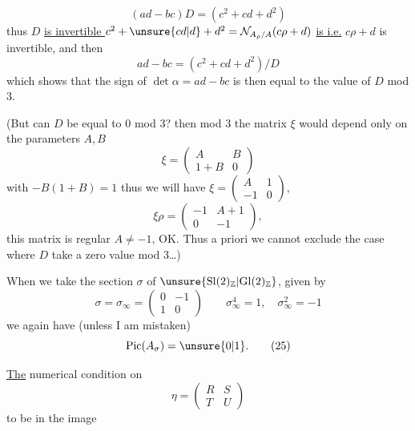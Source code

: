 
\[
(ad-bc)D=(c^2+cd+d^2) \tag{23}
\]
thus $D$ \uline{is invertible } $c^2+\unsure{cd|d}+d^2=\mathcal{N}_{A_\rho/A}(c\rho+d)$ \uline{is i.e.}  $c\rho+d$ is invertible, and then
\[
ad-bc=(c^2+cd+d^2)/D
\]
which shows that the sign of $\det\alpha=ad-bc$ is then equal to the value of $D$ mod $3$.

(But can $D$ be equal to $0$ mod $3$? then mod $3$ the matrix $\xi$  would depend only on the parameters $A,B$
\[
\xi=\begin{pmatrix}A&B\\1+B&0\end{pmatrix}
\]
with $-B(1+B)=1$   
thus we will have $\xi=\begin{pmatrix}A&1\\-1&0\end{pmatrix}$, 
\[
\xi\rho=\begin{pmatrix}-1&A+1\\0&-1\end{pmatrix},
\]
this matrix is regular  $A\ne-1$, OK.\unsure{)|\}} Thus a priori we cannot exclude the case where $D$  take a zero value mod $3$\ldots)

When we take the section $\sigma$ of $\unsure{\mathrm{Sl}(2)_{\mathbb{Z}}|\mathrm{Gl}(2)_{\mathbb{Z}}}$, given by
\[
\sigma=\sigma_\infty=\begin{pmatrix}0&-1\\1&0\end{pmatrix}
\qquad \sigma_\infty^4=1,\quad \sigma_\infty^2=-1 \tag{24}
\]
we again have (unless I am mistaken)
\[
\mathrm{Pic}(A_\sigma)=\unsure{0|1}. \tag{25}
\]

\uline{The} numerical condition on
\[
\eta=\begin{pmatrix}R&S\\T&U\end{pmatrix} \tag{26}
\]
to  be  in the image


